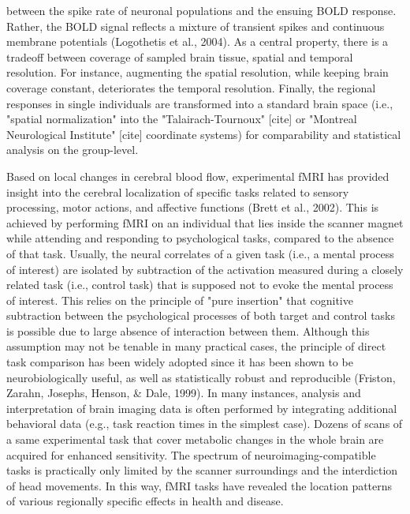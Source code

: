 \documentclass[authoryear,review,3p]{elsarticle}
\begin{document}
between the spike rate of neuronal populations and the ensuing
BOLD response. Rather, the BOLD signal reflects a mixture of
transient spikes and continuous membrane potentials (Logothetis et al., 2004).
%
As a central property, there is a tradeoff between
coverage of sampled brain tissue, spatial and temporal resolution. 
For instance, augmenting the spatial resolution, while keeping
brain coverage constant, deteriorates the temporal resolution.
%
Finally,
the regional responses in single individuals are transformed
into a standard brain space
(i.e., "spatial normalization" into the
"Talairach-Tournoux" [cite] or
"Montreal Neurological Institute" [cite]
coordinate systems)
for comparability and statistical analysis on the group-level.


Based on local changes in cerebral blood flow,
experimental fMRI has provided
insight into the cerebral localization
of specific tasks related to sensory processing, motor actions,
and affective functions
(Brett et al., 2002).
This is achieved by
performing fMRI on an individual that lies
inside the scanner magnet
while attending and responding to psychological tasks,
compared to the absence of that task.
Usually, the neural correlates of a given task
(i.e., a mental process of interest) are isolated by subtraction
of the activation measured during a closely related task (i.e., control task)
that is supposed not to evoke the mental process of interest.
This relies on the principle of "pure insertion" that
cognitive subtraction between the psychological processes of both
target and control tasks is possible due to large absence of
interaction between them.
Although this assumption may not be tenable in many
practical cases,
the principle of direct task comparison has been widely adopted
since it has been shown to be
neurobiologically useful, as well as statistically robust and reproducible
(Friston, Zarahn, Josephs, Henson, & Dale, 1999).
%
In many instances,
analysis and interpretation of brain imaging data
is often performed by integrating additional
behavioral data (e.g., task reaction times in the simplest case).
Dozens of scans of a same experimental task
that cover metabolic changes in the whole brain are acquired
for enhanced sensitivity.
%
The spectrum of neuroimaging-compatible tasks is practically
only limited by the scanner surroundings
and the interdiction of head movements.
%
In this way, fMRI tasks have revealed the location patterns of
various regionally specific effects in health and disease.
\end{document}
